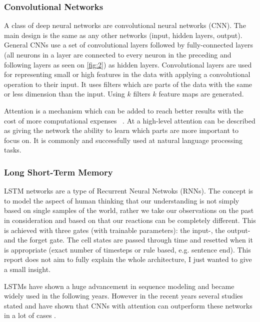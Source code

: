 \documentclass[11pt,a4paper,oneside]{article}
\begin{document}
  \subsubsection{Convolutional Networks}
  \label{sec:conv_nets}

  A class of deep neural networks are convolutional neural networks (CNN). The main design is the same as any other 
  networks (input, hidden layers, output). General CNNs use a set of convolutional layers followed by fully-connected 
  layers (all neurons in a layer are connected to every neuron in the preceding and following layers as seen on 
  \autoref{fig:2}) as hidden layers. Convolutional layers are used for representing small or high features in the data 
  with applying a convolutional operation to their input. It uses filters which are parts of the data with the same or 
  less dimension than the input. Using $k$ filters $k$ feature maps are generated.
  
  Attention is a mechanism which can be added to reach better results with the cost of more computational expenses 
  ~\cite{attention}. At a high-level attention can be described as giving the network the ability to learn which parts 
  are more important to focus on. It is commonly and successfully used at natural language processing tasks.

  \subsubsection{Long Short-Term Memory}
  \label{sec:lstm}

  LSTM networks \cite{lstm, lstm_colah} are a type of Recurrent Neural Netwoks (RNNs). The concept is to model the 
  aspect of human thinking that our understanding is not simply based on single samples of the world, rather we take 
  our observations on the past in consideration and based on that our reactions can be completely different. This is 
  achieved with three gates (with trainable parameters): the input-, the output- and the forget gate. The cell states 
  are passed through time and resetted when it is appropriate (exact number of timesteps or rule based, e.g. sentence 
  end). This report does not aim to fully explain the whole architecture, I just wanted to give a small insight.
  
  LSTMs have shown a huge advancement in sequence modeling and became widely used in the following years. However in the 
  recent years several studies stated and have shown that CNNs with attention can outperform these networks in a lot of 
  cases \cite{eval_conv_lstm, fall_rnn}.
\end{document}
